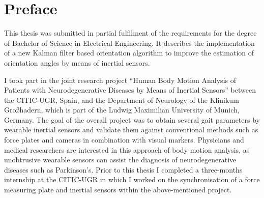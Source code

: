 \chapter{Preface}

This thesis was submitted in partial fulfilment of the requirements for the degree of Bachelor of Science in Electrical Engineering. It describes the implementation of a new Kalman filter based orientation algorithm to improve the estimation of orientation angles by means of inertial sensors.

I took part in the joint research project “Human Body Motion Analysis of Patients with Neurodegenerative Diseases by Means of Inertial Sensors” between the \gls{CITIC-UGR}, Spain, and the Department of Neurology of the Klinikum Großhadern, which is part of the Ludwig Maximilian University of Munich, Germany. The goal of the overall project was to obtain several gait parameters by wearable inertial sensors and validate them against conventional methods such as force plates and cameras in combination with visual markers. Physicians and medical researchers are interested in this approach of body motion analysis, as unobtrusive wearable sensors can assist the diagnosis of neurodegenerative diseases such as Parkinson's. Prior to this thesis I completed a three-months internship at the \gls{CITIC-UGR} in which I worked on the synchronisation of a force measuring plate and inertial sensors within the above-mentioned project.